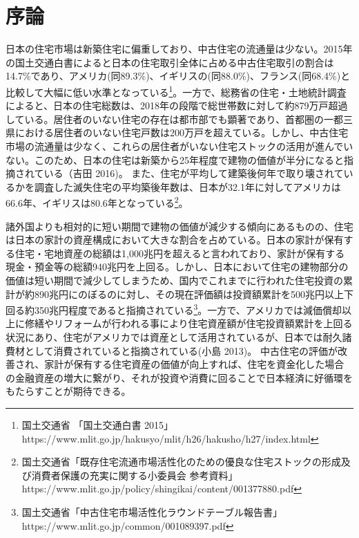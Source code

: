 \documentclass[a4paper,fontsize=11pt,report,notitlepage,line_length=38zw,number_of_lines=40]{jlreq}
\begin{document}
\newpage
\chapter{序論}
日本の住宅市場は新築住宅に偏重しており、中古住宅の流通量は少ない。2015年の国土交通白書によると日本の住宅取引全体に占める中古住宅取引の割合は14.7\%であり、アメリカ(同89.3\%)、イギリスの(同88.0\%)、フランス(同68.4\%)と比較して大幅に低い水準となっている\footnote{国土交通省 「国土交通白書 2015」 https://www.mlit.go.jp/hakusyo/mlit/h26/hakusho/h27/index.html}。一方で、総務省の住宅・土地統計調査によると、日本の住宅総数は、2018年の段階で総世帯数に対して約879万戸超過している。居住者のいない住宅の存在は都市部でも顕著であり、首都圏の一都三県における居住者のいない住宅戸数は200万戸を超えている。しかし、中古住宅市場の流通量は少なく、これらの居住者がいない住宅ストックの活用が進んでいない。このため、日本の住宅は新築から25年程度で建物の価値が半分になると指摘されている（吉田 2016)\cite{yoshida2016}。
また、住宅が平均して建築後何年で取り壊されているかを調査した滅失住宅の平均築後年数は、日本が32.1年に対してアメリカは66.6年、イギリスは80.6年となっている\footnote{国土交通省「既存住宅流通市場活性化のための優良な住宅ストックの形成及び消費者保護の充実に関する小委員会 参考資料」 https://www.mlit.go.jp/policy/shingikai/content/001377880.pdf}。

諸外国よりも相対的に短い期間で建物の価値が減少する傾向にあるものの、住宅は日本の家計の資産構成において大きな割合を占めている。日本の家計が保有する住宅・宅地資産の総額は1,000兆円を超えると言われており、家計が保有する現金・預金等の総額940兆円を上回る。しかし、日本において住宅の建物部分の価値は短い期間で減少してしまうため、国内でこれまでに行われた住宅投資の累計が約890兆円にのぼるのに対し、その現在評価額は投資額累計を500兆円以上下回る約350兆円程度であると指摘されている\footnote{国土交通省「中古住宅市場活性化ラウンドテーブル報告書」https://www.mlit.go.jp/common/001089397.pdf}。一方で、アメリカでは減価償却以上に修繕やリフォームが行われる事により住宅資産額が住宅投資額累計を上回る状況にあり、住宅がアメリカでは資産として活用されているが、日本では耐久諸費材として消費されていると指摘されている(小島 2013)\cite{kojima2013}。
中古住宅の評価が改善され、家計が保有する住宅資産の価値が向上すれば、住宅を資金化した場合の金融資産の増大に繋がり、それが投資や消費に回ることで日本経済に好循環をもたらすことが期待できる。
\end{document}
